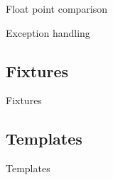 \documentclass{beamer}
\newcommand{\inlinecpp}[1]{
    \lstinline[language=C++]{#1}
}
\begin{document}

        \begin{frame}{Float point comparison}
            
        \end{frame}

        \begin{frame}{Exception handling}
                  
        \end{frame}

        \subsection{Fixtures}
        \begin{frame}[plain]{Fixtures}
            
        \end{frame}

        \subsection{Templates}
        \begin{frame}[plain]{Templates}
            
        \end{frame}
\end{document}
